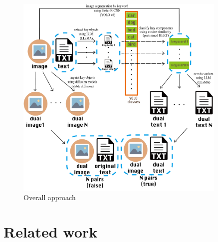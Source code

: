 \documentclass[11pt,letterpaper]{article}
\begin{document}

\begin{figure}[H]
    \centering
    \includegraphics[width=0.9\textwidth]{midterm_report/assets/pipeline.png}
    \caption{Overall approach}
\end{figure}






\section{Related work}
\end{document}
